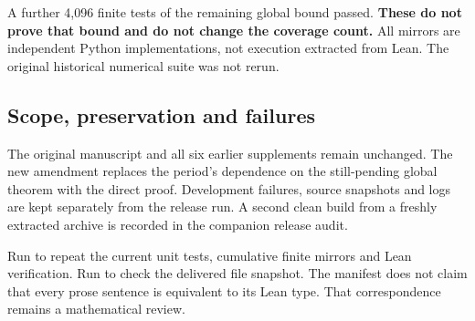 A further 4,096 finite tests of the remaining global bound passed. \textbf{These do not prove that bound and do not change the coverage count.} All mirrors are independent Python implementations, not execution extracted from Lean. The original historical numerical suite was not rerun.

\subsection*{Scope, preservation and failures}
The original manuscript and all six earlier supplements remain unchanged. The new amendment replaces the period's dependence on the still-pending global theorem with the direct proof. Development failures, source snapshots and logs are kept separately from the release run. A second clean build from a freshly extracted archive is recorded in the companion release audit.

Run  to repeat the current unit tests, cumulative finite mirrors and Lean verification. Run  to check the delivered file snapshot. The manifest does not claim that every prose sentence is equivalent to its Lean type. That correspondence remains a mathematical review.
